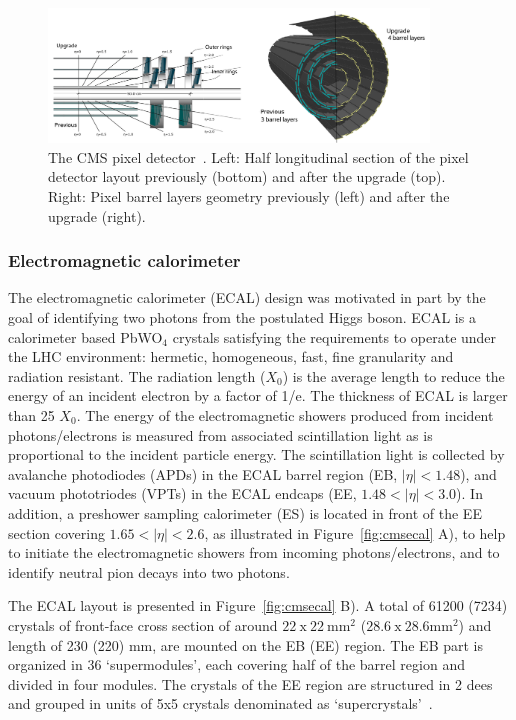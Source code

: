 \begin{figure}[ht!]
\centering
\includegraphics[width=0.9\textwidth]{Figures/Apparatus/cmstrackingsystemphase1.png}
\caption[The CMS pixel detector]{The CMS pixel detector~\cite{cmspixelupgrade}. Left: Half longitudinal section of the pixel detector layout previously (bottom) and after the upgrade (top). Right: Pixel barrel layers geometry previously (left) and after the upgrade (right).}
\label{fig:cmstrackingsystemphase1}
\end{figure}

\subsubsection{Electromagnetic calorimeter}
The electromagnetic calorimeter (ECAL) design was motivated in part by the goal of identifying two photons from the postulated Higgs boson. ECAL is a calorimeter based PbWO$_{4}$ crystals satisfying the requirements to operate under the LHC environment: hermetic, homogeneous, fast, fine granularity and radiation resistant. The radiation length ($X_{0}$) is the average length to reduce the energy of an incident electron by a factor of 1/e. The thickness of ECAL is larger than 25 $X_{0}$. The energy of the electromagnetic showers produced from incident photons/electrons is measured from associated scintillation light as is proportional to the incident particle energy. The scintillation light is collected by avalanche photodiodes (APDs) in the ECAL barrel region (EB, $|\eta|<1.48$), and vacuum phototriodes (VPTs) in the ECAL endcaps (EE, $1.48<|\eta|<3.0$). In addition, a preshower sampling calorimeter (ES) is located in front of the EE section covering $1.65<|\eta|<2.6$, as illustrated in Figure~\ref{fig:cmsecal} A), to help to initiate the electromagnetic showers from incoming photons/electrons, and to identify neutral pion decays into two photons.

The ECAL layout is presented in Figure~\ref{fig:cmsecal} B). A total of 61200 (7234) crystals of front-face cross section of around $\mathrm{22~x~22~mm^{2}}$ ($\mathrm{28.6~x~28.6 mm^{2}}$) and length of 230 (220) mm, are mounted on the EB (EE) region. The EB part is organized in 36 `supermodules', each covering half of the barrel region and divided in four modules. The crystals of the EE region are structured in 2 dees and grouped in units of 5x5 crystals denominated as `supercrystals'~\cite{CMS:2008xjf}.

